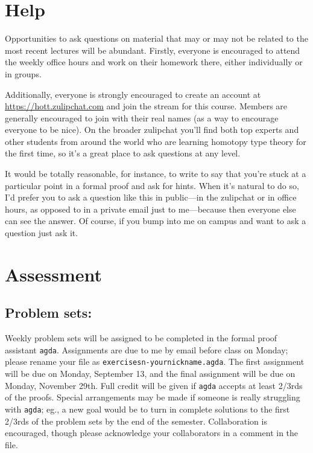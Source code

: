 \documentclass{amsart}
\theoremstyle{definition}
\theoremstyle{remark}
\numberwithin{equation}{section}
\begin{document}
\section*{Help}

Opportunities to ask questions on material that may or may not be related to the most recent lectures will be abundant. Firstly, everyone is encouraged to attend the weekly office hours and work on their homework there, either individually or in groups. 

Additionally, everyone is strongly encouraged to create an account at \url{https://hott.zulipchat.com} and join the stream for this course. Members are generally encouraged to join with their real names (as a way to encourage everyone to be nice). On the broader zulipchat you'll find both top experts and other students from around the world who are learning homotopy type theory for the first time, so it's a great place to ask questions at any level. 

It would be totally reasonable, for instance, to write to say that you're stuck at a particular point in a formal proof and ask for hints. When it's natural to do so, I'd prefer you to ask a question like this in public---in the zulipchat or in office hours, as opposed to in a private email just to me---because then everyone else can see the answer. Of course, if you bump into me on campus and want to ask a question just ask it.

\section*{Assessment}

\subsection*{Problem sets:}
Weekly problem sets will be assigned to be completed in the formal proof assistant \texttt{agda}. Assignments are due to me by email before class on Monday; please rename your file as \texttt{exercisesn-yournickname.agda}. The first assignment will be due on Monday, September 13, and the final assignment will be due on Monday, November 29th. Full credit will be given if \texttt{agda} accepts at least 2/3rds of the proofs. Special arrangements may be made if someone is really struggling with \texttt{agda}; eg., a new goal would be to turn in complete solutions to the first 2/3rds of the problem sets by the end of the semester. Collaboration is encouraged, though please acknowledge your collaborators in a comment in the file.
\end{document}

